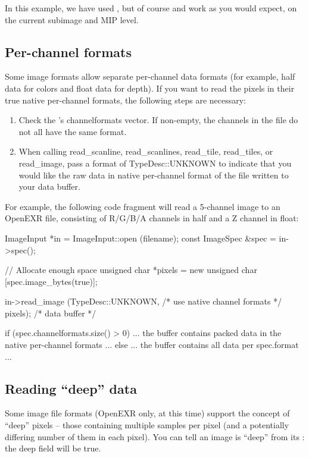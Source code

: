 In this example, we have used \readimage, but of course \readscanline
and \readtile work as you would expect, on the current subimage and MIP
level.


\subsection{Per-channel formats}
\label{sec:imageinput:channelformats}

Some image formats allow separate per-channel data formats (for example,
{\cf half} data for colors and {\cf float} data for depth).  If you want
to read the pixels in their true native per-channel formats,
the following steps are necessary:

\begin{enumerate}
\item Check the \ImageSpec's {\cf channelformats} vector.  If non-empty,
  the channels in the file do not all have the same format.
\item When calling {\cf read_scanline}, {\cf read_scanlines},
  {\cf read_tile}, {\cf read_tiles}, or {\cf read_image}, 
  pass a format of {\cf TypeDesc::UNKNOWN} to indicate that
  you would like the raw data in native per-channel format of the file
  written to your {\cf data} buffer.
\end{enumerate}

For example, the following code fragment will read a 5-channel image
to an OpenEXR file, consisting of R/G/B/A channels in {\cf half} and
a Z channel in {\cf float}:

\begin{code}
        ImageInput *in = ImageInput::open (filename);
        const ImageSpec &spec = in->spec();

        // Allocate enough space
        unsigned char *pixels = new unsigned char [spec.image_bytes(true)];

        in->read_image (TypeDesc::UNKNOWN, /* use native channel formats */
                        pixels);           /* data buffer */

        if (spec.channelformats.size() > 0) {
            ... the buffer contains packed data in the native 
                per-channel formats ...
        } else {
            ... the buffer contains all data per spec.format ...
        }
\end{code}


\subsection{Reading ``deep'' data}
\label{sec:imageinput:deepdata}  
\NEW
Some image file formats (OpenEXR only, at this time) support the concept
of ``deep'' pixels -- those containing multiple samples per pixel (and a
potentially differing number of them in each pixel).
You can tell an image is ``deep'' from its \ImageSpec: the {\cf deep}
field will be {\cf true}.

